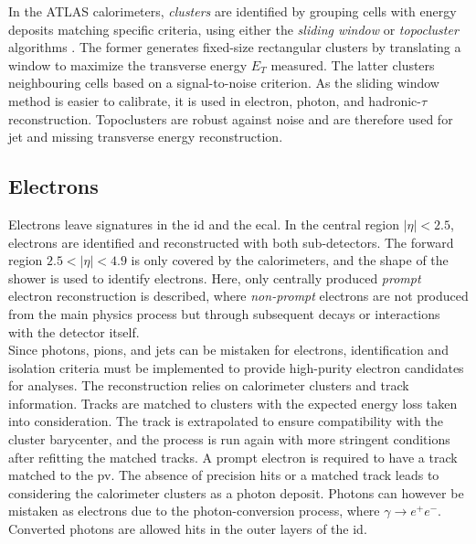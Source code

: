 In the ATLAS calorimeters, \textit{clusters} are identified by grouping cells with energy deposits matching specific criteria, using either the \textit{sliding window} or \textit{topocluster} algorithms \cite{Lampl:1099735}. The former generates fixed-size rectangular clusters by translating a window to maximize the transverse energy $E_T$ measured. The latter clusters neighbouring cells based on a signal-to-noise criterion. As the sliding window method is easier to calibrate, it is used in electron, photon, and hadronic-$\tau$ reconstruction. Topoclusters are robust against noise and are therefore used for jet and missing transverse energy reconstruction.

\subsection{Electrons}\label{sec-atlas-el}
Electrons leave signatures in the \gls{id} and the \gls{ecal}. In the central region $|\eta| < 2.5$, electrons are identified and reconstructed with both sub-detectors. The forward region $2.5 < |\eta| < 4.9$ is only covered by the calorimeters, and the shape of the shower is used to identify electrons. Here, only centrally produced \textit{prompt} electron reconstruction is described, where \textit{non-prompt} electrons are not produced from the main physics process but through subsequent decays or interactions with the detector itself. \\

Since photons, pions, and jets can be mistaken for electrons, identification and isolation criteria must be implemented to provide high-purity electron candidates for analyses. The reconstruction relies on calorimeter clusters and track information. Tracks are matched to clusters with the expected energy loss taken into consideration. The track is extrapolated to ensure compatibility with the cluster barycenter, and the process is run again with more stringent conditions after refitting the matched tracks. A prompt electron is required to have a track matched to the \gls{pv}. The absence of precision hits or a matched track leads to considering the calorimeter clusters as a photon deposit. Photons can however be mistaken as electrons due to the photon-conversion process, where $\gamma \rightarrow e^+e^-$. Converted photons are allowed hits in the outer layers of the \gls{id}. \\

